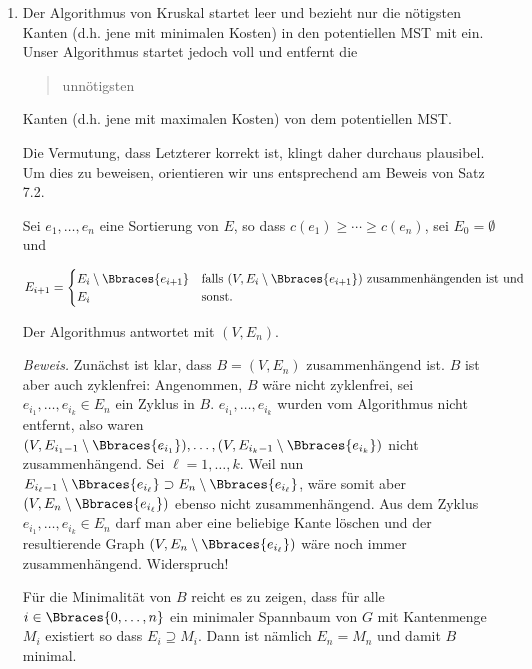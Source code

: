 \begin{solution}

\phantom{}

\begin{enumerate}[label = (\Alph*)]

    \item Der Algorithmus von Kruskal startet leer und bezieht nur die nötigsten Kanten (d.h. jene mit minimalen Kosten) in den potentiellen MST mit ein.
    Unser Algorithmus startet jedoch voll und entfernt die \blockquote{unnötigsten} Kanten (d.h. jene mit maximalen Kosten) von dem potentiellen MST.

    Die Vermutung, dass Letzterer korrekt ist, klingt daher durchaus plausibel.
    Um dies zu beweisen, orientieren wir uns entsprechend am Beweis von Satz 7.2.

    Sei $e_1, \dots, e_n$ eine Sortierung von $E$, so dass $c(e_1) \geq \cdots \geq c(e_n)$, sei $E_0 = \emptyset$ und

    \begin{align*}
        E_{i+1}
        =
        \begin{cases}
            E_i \setminus \Bbraces{e_{i+1}} & \text{falls}~ (V, E_i \setminus \Bbraces{e_{i+1}}) ~\text{zusammenhängenden ist und} \\
            E_i                             & \text{sonst.}
        \end{cases}
    \end{align*}

    Der Algorithmus antwortet mit $(V, E_n)$.

    \textit{Beweis.}
    Zunächst ist klar, dass $B = (V, E_n)$ zusammenhängend ist.
    $B$ ist aber auch zyklenfrei:
    Angenommen, $B$ wäre nicht zyklenfrei, sei $e_{i_1}, \dots, e_{i_k} \in E_n$ ein Zyklus in $B$.
    $e_{i_1}, \dots, e_{i_k}$ wurden vom Algorithmus nicht entfernt, also waren $(V, E_{i_1 - 1} \setminus \Bbraces{e_{i_1}}), \dots, (V, E_{i_k - 1} \setminus \Bbraces{e_{i_k}})$ nicht zusammenhängend.
    Sei $\ell = 1, \dots, k$.
    Weil nun $E_{i_\ell - 1} \setminus \Bbraces{e_{i_\ell}} \supset E_n \setminus \Bbraces{e_{i_\ell}}$, wäre somit aber $(V, E_n \setminus \Bbraces{e_{i_\ell}})$ ebenso nicht zusammenhängend.
    Aus dem Zyklus $e_{i_1}, \dots, e_{i_k} \in E_n$ darf man aber eine beliebige Kante löschen und der resultierende Graph $(V, E_n \setminus \Bbraces{e_{i_\ell}})$ wäre noch immer zusammenhängend.
    Widerspruch!

    Für die Minimalität von $B$ reicht es zu zeigen, dass für alle $i \in \Bbraces{0, \dots, n}$ ein minimaler Spannbaum von $G$ mit Kantenmenge $M_i$ existiert so dass $E_i \supseteq M_i$.
    Dann ist nämlich $E_n = M_n$ und damit $B$ minimal.


\end{enumerate}
\end{solution}
